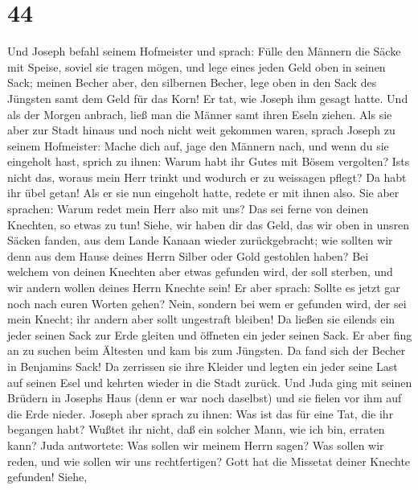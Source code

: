 \hypertarget{section-43}{%
\section{44}\label{section-43}}

 Und Joseph befahl seinem Hofmeister und sprach: Fülle den
Männern die Säcke mit Speise, soviel sie tragen mögen, und lege eines
jeden Geld oben in seinen Sack;  meinen Becher aber, den
silbernen Becher, lege oben in den Sack des Jüngsten samt dem Geld für
das Korn! Er tat, wie Joseph ihm gesagt hatte.  Und als
der Morgen anbrach, ließ man die Männer samt ihren Eseln ziehen.
 Als sie aber zur Stadt hinaus und noch nicht weit
gekommen waren, sprach Joseph zu seinem Hofmeister: Mache dich auf, jage
den Männern nach, und wenn du sie eingeholt hast, sprich zu ihnen: Warum
habt ihr Gutes mit Bösem vergolten?  Ist\textquotesingle s
nicht das, woraus mein Herr trinkt und wodurch er zu weissagen pflegt?
Da habt ihr übel getan!  Als er sie nun eingeholt hatte,
redete er mit ihnen also.  Sie aber sprachen: Warum redet
mein Herr also mit uns? Das sei ferne von deinen Knechten, so etwas zu
tun!  Siehe, wir haben dir das Geld, das wir oben in
unsren Säcken fanden, aus dem Lande Kanaan wieder zurückgebracht; wie
sollten wir denn aus dem Hause deines Herrn Silber oder Gold gestohlen
haben?  Bei welchem von deinen Knechten aber etwas
gefunden wird, der soll sterben, und wir andern wollen deines Herrn
Knechte sein!  Er aber sprach: Sollte es jetzt gar noch
nach euren Worten gehen? Nein, sondern bei wem er gefunden wird, der sei
mein Knecht; ihr andern aber sollt ungestraft bleiben! 
Da ließen sie eilends ein jeder seinen Sack zur Erde gleiten und
öffneten ein jeder seinen Sack.  Er aber fing an zu
suchen beim Ältesten und kam bis zum Jüngsten. Da fand sich der Becher
in Benjamins Sack!  Da zerrissen sie ihre Kleider und
legten ein jeder seine Last auf seinen Esel und kehrten wieder in die
Stadt zurück.  Und Juda ging mit seinen Brüdern in
Josephs Haus (denn er war noch daselbst) und sie fielen vor ihm auf die
Erde nieder.  Joseph aber sprach zu ihnen: Was ist das
für eine Tat, die ihr begangen habt? Wußtet ihr nicht, daß ein solcher
Mann, wie ich bin, erraten kann?  Juda antwortete: Was
sollen wir meinem Herrn sagen? Was sollen wir reden, und wie sollen wir
uns rechtfertigen? Gott hat die Missetat deiner Knechte gefunden! Siehe,
